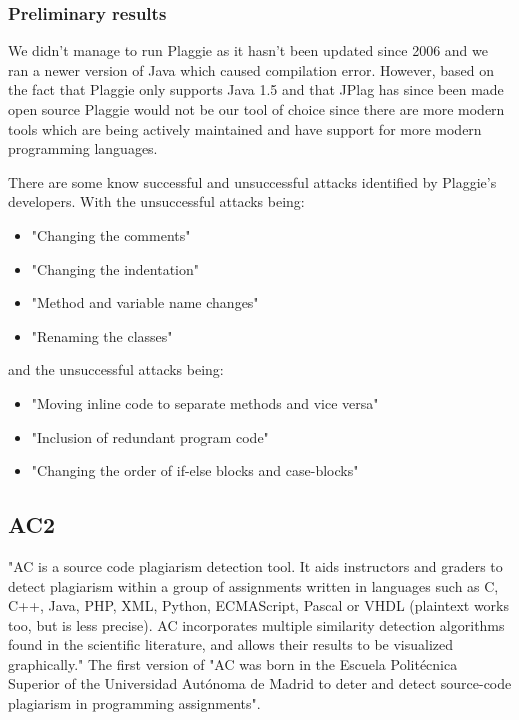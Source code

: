 \documentclass[a4paper, 11pt]{article}
\renewcommand{\\}{\vspace*{0.5\baselineskip} \newline}
\begin{document}
\subsubsection{Preliminary results}

We didn't manage to run Plaggie as it hasn't been updated since 2006 and we ran a newer version of Java which caused compilation error. However, based
on the fact that Plaggie only supports Java 1.5 and that JPlag has since been made open source Plaggie would not be our tool of choice since there are
more modern tools which are being actively maintained and have support for more modern programming languages.

There are some know successful and unsuccessful attacks identified by Plaggie's developers. With the unsuccessful attacks being:
\begin{itemize}
	\item "Changing the comments"
	\item "Changing the indentation"
	\item "Method and variable name changes"
	\item "Renaming the classes"
\end{itemize} \autocite[Known successful attacks]{RMP}

and the unsuccessful attacks being:
\begin{itemize}
	\item "Moving inline code to separate methods and vice versa"
	\item "Inclusion of redundant program code"
	\item "Changing the order of if-else blocks and case-blocks"
\end{itemize}
\autocite[Known unsuccessful attacks]{RMP}

\newpage

\subsection{AC2}

"AC is a source code plagiarism detection tool. It aids instructors and graders to detect plagiarism within a group of assignments written in languages such as C, C++, Java, PHP, XML, Python, ECMAScript, Pascal or VHDL (plaintext works too, but is less precise). AC incorporates multiple similarity detection algorithms found in the scientific literature, and allows their results to be visualized graphically." \autocite{AC2} The first version of "AC was born in the Escuela Politécnica Superior of the Universidad Autónoma de Madrid to deter and detect source-code plagiarism in programming assignments". \autocite{AC2}
\end{document}
